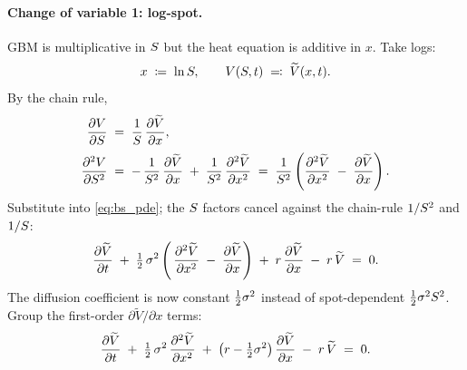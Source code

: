 \paragraph{Change of variable 1: log-spot.}
GBM is multiplicative in $S$ but the heat equation is
additive in $x$. Take logs:
\begin{equation*}
  x \;\coloneqq\; \ln S,
  \qquad
  V(S, t) \;\eqqcolon\; \widetilde V(x, t).
\end{equation*}
By the chain rule,
\begin{align*}
  \frac{\partial V}{\partial S}
  \;&=\; \frac{1}{S}\,\frac{\partial \widetilde V}{\partial x},
  \\[0.25em]
  \frac{\partial^2 V}{\partial S^2}
  \;&=\; -\,\frac{1}{S^2}\,\frac{\partial \widetilde V}{\partial x}
       \;+\; \frac{1}{S^2}\,\frac{\partial^2 \widetilde V}{\partial x^2}
  \;=\; \frac{1}{S^2}
        \left(\frac{\partial^2 \widetilde V}{\partial x^2}
              \;-\; \frac{\partial \widetilde V}{\partial x}\right).
\end{align*}
Substitute into \eqref{eq:bs_pde}; the $S$ factors cancel
against the chain-rule $1/S^2$ and $1/S$:
\begin{equation}
  \frac{\partial \widetilde V}{\partial t}
  \;+\; \tfrac{1}{2}\,\sigma^2
        \left(\,\frac{\partial^2 \widetilde V}{\partial x^2}
              \;-\; \frac{\partial \widetilde V}{\partial x}\right)
  \;+\; r\,\frac{\partial \widetilde V}{\partial x}
  \;-\; r\,\widetilde V
  \;=\; 0.
  \label{eq:bspde_logS}
\end{equation}
The diffusion coefficient is now constant $\tfrac{1}{2}\sigma^2$
instead of spot-dependent $\tfrac{1}{2}\sigma^2S^2$. Group the
first-order $\partial \widetilde V/\partial x$ terms:
\begin{equation}
  \frac{\partial \widetilde V}{\partial t}
  \;+\; \tfrac{1}{2}\,\sigma^2\,\frac{\partial^2 \widetilde V}{\partial x^2}
  \;+\; \bigl(r - \tfrac{1}{2}\sigma^2\bigr)\,
        \frac{\partial \widetilde V}{\partial x}
  \;-\; r\,\widetilde V
  \;=\; 0.
  \label{eq:bspde_logS_grouped}
\end{equation}

